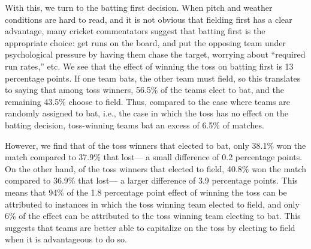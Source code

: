 \documentclass[11pt,  letterpaper]{article}
\begin{document}
With this, we turn to the batting first decision. When pitch and weather conditions are hard to read, and it is not obvious that fielding first has a clear advantage, many cricket commentators suggest that batting first is the appropriate choice: get runs on the board, and put the opposing team under psychological pressure by having them chase the target, worrying about ``required run rates,'' etc. We see that the effect of winning the toss on batting first is 13 percentage points. If one team bats, the other team must field, so this translates to saying that among toss winners, 56.5\% of the teams elect to bat, and the remaining 43.5\% choose to field. Thus, compared to the case where teams are randomly assigned to bat, i.e., the case in which the toss has no effect on the batting decision, toss-winning teams bat an excess of 6.5\% of matches. 

However, we find that of the toss winners that elected to bat, only 38.1\% won the match compared to 37.9\% that lost--- a small difference of 0.2 percentage points. On the other hand, of the toss winners that elected to field, 40.8\% won the match compared to 36.9\% that lost--- a larger difference of 3.9 percentage points. This means that 94\% of the 1.8 percentage point effect of winning the toss can be attributed to instances in which the toss winning team elected to field, and only 6\% of the effect can be attributed to the toss winning team electing to bat. This suggests that teams are better able to capitalize on the toss by electing to field when it is advantageous to do so. 
%
%
\end{document}
